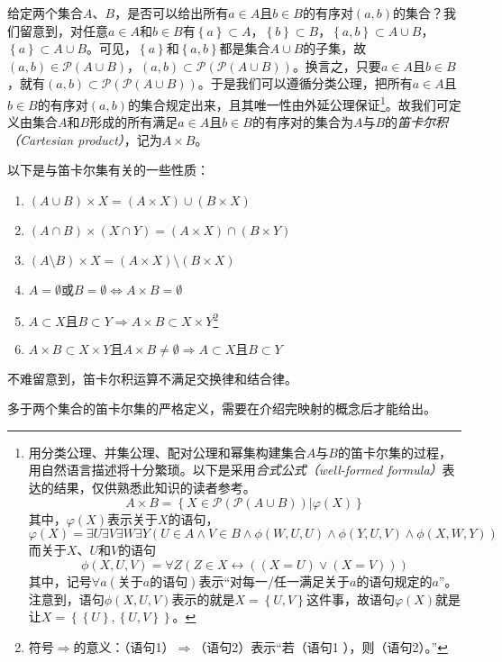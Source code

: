 \documentclass[../main.tex]{subfiles}
\begin{document}
给定两个集合$A$、$B$，是否可以给出所有$a\in A$且$b\in B$的有序对$\left(a,b\right)$的集合？我们留意到，对任意$a\in A$和$b\in B$有$\left\{a\right\}\subset A$，$\left\{b\right\}\subset B$，$\left\{a,b\right\}\subset A\cup B$，$\left\{a\right\}\subset A\cup B$。可见，$\left\{a\right\}$和$\left\{a,b\right\}$都是集合$A\cup B$的子集，故$\left(a,b\right)\in\mathcal{P}\left(A\cup B\right)$，$\left(a,b\right)\subset\mathcal{P}\left(\mathcal{P}\left(A\cup B\right)\right)$。换言之，只要$a\in A$且$b\in B$，就有$\left(a,b\right)\subset\mathcal{P}\left(\mathcal{P}\left(A\cup B\right)\right)$。于是我们可以遵循分类公理，把所有$a\in A$且$b\in B$的有序对$\left(a,b\right)$的集合规定出来，且其唯一性由外延公理保证\footnote{
    用分类公理、并集公理、配对公理和幂集构建集合$A$与$B$的笛卡尔集的过程，用自然语言描述将十分繁琐。以下是采用\emph{合式公式（well-formed formula）}表达的结果，仅供熟悉此知识的读者参考。
    \[A\times B=\left\{X\in\mathcal{P}\left(\mathcal{P}\left(A\cup B\right)\right)|\varphi\left(X\right)\right\}
    \]
    其中，$\varphi\left(X\right)$表示关于$X$的语句，
    \[
        \varphi\left(X\right)=\exists U\exists V\exists W \exists Y\left(U\in A \wedge V\in B\wedge \phi\left(W,U,U\right)\wedge\phi\left(Y,U,V\right)\wedge\phi\left(X,W,Y\right)\right)
    \]
    而关于$X$、$U$和$V$的语句
    \[
        \phi\left(X,U,V\right)=\forall Z\left(Z\in X\leftrightarrow\left(\left(X=U\right)\vee\left(X=V\right)\right)\right)
    \]
    其中，记号$\forall a\left(\text{关于$a$的语句}\right)$表示“对每一/任一满足关于$a$的语句规定的$a$”。注意到，语句$\phi\left(X,U,V\right)$表示的就是$X=\left\{U,V\right\}$这件事，故语句$\varphi\left(X\right)$就是让$X=\left\{\left\{U\right\},\left\{U,V\right\}\right\}$。
}。故我们可定义由集合$A$和$B$形成的所有满足$a\in A$且$b\in B$的有序对的集合为$A$与$B$的\emph{笛卡尔积（Cartesian product）}，记为$A\times B$。

以下是与笛卡尔集有关的一些性质：
\begin{enumerate}
    \item $\left(A\cup B\right)\times X=\left(A\times X\right)\cup\left(B\times X\right)$
    \item $\left(A\cap B\right)\times \left(X\cap Y\right)=\left(A\times X\right)\cap\left(B\times Y\right)$
    \item $\left(A\setminus B\right)\times X=\left(A\times X\right)\setminus \left(B\times X\right)$
    \item $A=\emptyset\text{或}B=\emptyset\Leftrightarrow A\times B=\emptyset$
    \item $A\subset X\text{且}B\subset Y\Rightarrow A\times B\subset X\times Y$\footnote{符号$\Rightarrow$的意义：（语句1）$\Rightarrow$（语句2）表示“若（语句1 ），则（语句2）。”}
    \item $A\times B\subset X\times Y\text{且}A\times B\neq\emptyset\Rightarrow A\subset X\text{且}B\subset Y$
\end{enumerate}

不难留意到，笛卡尔积运算不满足交换律和结合律。

多于两个集合的笛卡尔集的严格定义，需要在介绍完映射的概念后才能给出。

\end{document}
